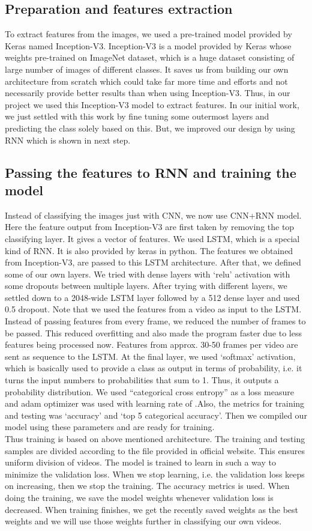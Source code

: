 \documentclass[a4paper,12pt]{article}
\begin{document}
\subsection{Preparation and features extraction}
To extract features from the images, we used a pre-trained model provided by Keras named Inception-V3. Inception-V3 is a model provided by Keras whose weights pre-trained on ImageNet dataset, which is a huge dataset consisting of large number of images of different classes. It saves us from building our own architecture from scratch which could take far more time and efforts and not necessarily provide better results than when using Inception-V3. Thus, in our project we used this Inception-V3 model to extract features. In our initial work, we just settled with this work by fine tuning some outermost layers and predicting the class solely based on this. But, we improved our design by using RNN which is shown in next step.
\subsection{Passing the features to RNN and training the model}
Instead of classifying the images just with CNN, we now use CNN+RNN model. Here the feature output from Inception-V3 are first taken by removing the top classifying layer. It gives a vector of features. We used LSTM, which is a special kind of RNN. It is also provided by keras in python. The features we obtained from Inception-V3, are passed to this LSTM architecture. After that, we defined some of our own layers. We tried with dense layers with ‘relu’ activation with some dropouts between multiple layers. After trying with different layers, we settled down to a 2048-wide LSTM layer followed by a 512 dense layer and used 0.5 dropout. Note that we used the features from a video as input to the LSTM. Instead of passing features from every frame, we reduced the number of frames to be passed. This reduced overfitting and also made the program faster due to less features being processed now. Features from approx. 30-50 frames per video are sent as sequence to the LSTM. At the final layer, we used ‘softmax’ activation, which is basically used to provide a class as output in terms of probability, i.e. it turns the input numbers to probabilities that sum to 1. Thus, it outputs a probability distribution. We used “categorical cross entropy” as a loss measure and adam optimizer was used with learning rate of .Also, the metrics for training and testing was ‘accuracy’ and ‘top 5 categorical accuracy’. Then we compiled our model using these parameters and are ready for training. \\Thus training is based on above mentioned architecture. The training and testing samples are divided according to the file provided in official website. This ensures uniform division of videos. The model is trained to learn in such a way to minimize the validation loss. When we stop learning, i.e. the validation loss keeps on increasing, then we stop the training. The accuracy metrics is used. When doing the training, we save the model weights whenever validation loss is decreased. When training finishes, we get the recently saved weights as the best weights and we will use those weights further in classifying our own videos. 
\end{document}
